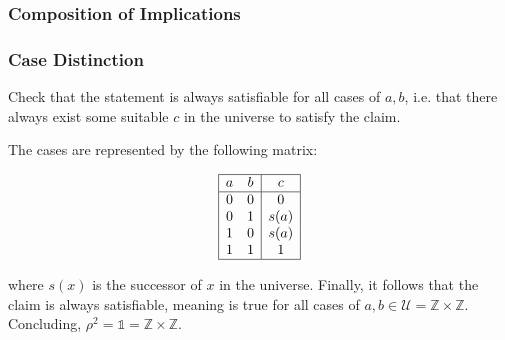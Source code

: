 \documentclass[unicode,11pt,a4paper,oneside,numbers=endperiod,openany]{scrartcl}
\begin{document}
\subsubsection*{Composition of Implications}

\subsubsection*{Case Distinction}

Check that the statement is always satisfiable for all cases of \( a, b \),
i.e. that there always exist some suitable \( c \) in the universe to satisfy the claim.

The cases are represented by the following matrix:

\[
    \begin{array}{|cc|c|}
        \hline
        a & b & c \\
        \hline
        0 & 0 & 0    \\
        0 & 1 & s(a) \\
        1 & 0 & s(a) \\
        1 & 1 & 1    \\
        \hline
    \end{array}
\]

where \( s(x) \) is the successor of \( x \) in the universe.
Finally, it follows that the claim is always satisfiable, 
meaning is true for all cases of \( a, b \in \mathcal{U} = \mathbb{Z} \times \mathbb{Z} \).
Concluding, \( \rho^2 = \mathds{1} = \mathbb{Z} \times \mathbb{Z} \).
\end{document}
